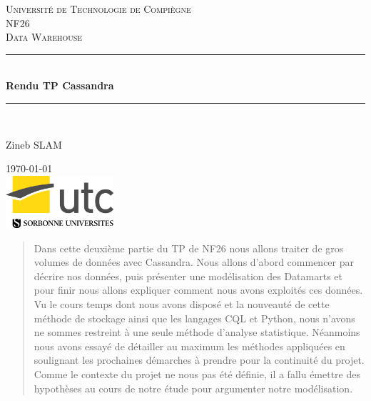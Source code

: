 \documentclass[]{report}
\begin{document}
	
	\begin{titlepage}
		
		\newcommand{\HRule}{\rule{\linewidth}{0.5mm}} 
		
		\center 
		
		\textsc{\LARGE Université de Technologie de Compiègne}\\[1.5cm]
		\textsc{\Large NF26}\\[0.5cm] 
		\textsc{\large Data Warehouse}\\[0.5cm]
		
		\HRule \\[0.4cm]
		{ \huge \bfseries Rendu TP Cassandra}\\[0.4cm] 
		\HRule \\[1.5cm]
		
		
		\begin{center}
			Zineb \textsc{SLAM} 
		\end{center}
		
		{\large \today}\\[2cm] 
		
		\includegraphics[width=40mm]{Figures/utc.jpg}\\ %
		
		\vfill
		
	\end{titlepage}
	
	
	\begin{abstract}
		Dans cette deuxième partie du TP de NF26 nous allons traiter de gros volumes de données avec Cassandra. Nous allons d'abord commencer par décrire nos données, puis présenter une modélisation des Datamarts et pour finir nous allons expliquer comment nous avons exploités ces données. Vu le cours temps dont nous avons disposé et la nouveauté de cette méthode de stockage ainsi que les langages CQL et Python, nous  n'avons ne sommes restreint à une seule méthode d'analyse statistique. Néanmoins nous avons essayé de détailler au maximum les méthodes appliquées en soulignant les prochaines démarches  à prendre pour la continuité du projet. Comme le contexte du projet ne nous pas été définie, il a fallu émettre des hypothèses au cours de notre étude pour argumenter notre modélisation.
	\end{abstract}
	
\end{document}
